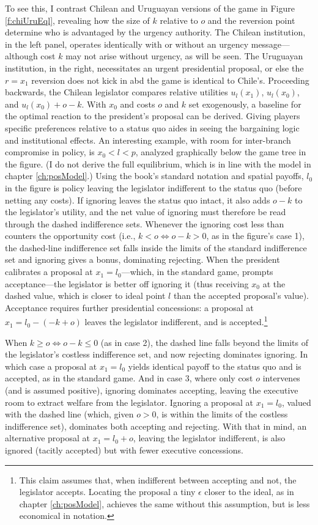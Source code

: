 \documentclass[letter,12pt]{article}
\begin{document}
To see this, I contrast Chilean and Uruguayan versions of the game in Figure \ref{f:chiUruEql}, revealing how the size of $k$ relative to $o$ and the reversion point determine who is advantaged by the urgency authority. The Chilean institution, in the left panel, operates identically with or without an urgency message---although cost $k$ may not arise without urgency, as will be seen. The Uruguayan institution, in the right, necessitates an urgent presidential proposal, or else the $r=x_1$ reversion does not kick in abd the game is identical to Chile's. Proceeding backwards, the Chilean legislator compares relative utilities $u_l(x_1)$, $u_l(x_0)$, and $u_l(x_0)+o-k$. With $x_0$ and costs $o$ and $k$ set exogenously, a baseline for the optimal reaction to the president's proposal can be derived. Giving players specific preferences relative to a status quo aides in seeing the bargaining logic and institutional effects. An interesting example, with room for inter-branch compromise in policy, is $x_0 < l < p$, analyzed graphically below the game tree in the figure. (I do not derive the full equilibrium, which is in line with the model in chapter \ref{ch:posModel}.) Using the book's standard notation and spatial payoffs, $l_0$ in the figure is policy leaving the legislator indifferent to the status quo (before netting any costs). If ignoring leaves the status quo intact, it also adds $o-k$ to the legislator's utility, and the net value of ignoring must therefore be read through the dashed indifference sets. Whenever the ignoring cost less than counters the opportunity cost (i.e., $k<o \iff o-k>0$, as in the figure's case 1), the dashed-line indifference set falls inside the limits of the standard indifference set and ignoring gives a bonus, dominating rejecting. When the president calibrates a proposal at $x_1 = l_0$---which, in the standard game, prompts acceptance---the legislator is better off ignoring it (thus receiving $x_0$ at the dashed value, which is closer to ideal point $l$ than the accepted proposal's value). Acceptance requires further presidential concessions: a proposal at $x_1=l_0-(-k+o)$ leaves the legislator indifferent, and is accepted.\footnote{This claim assumes that, when indifferent between accepting and not, the legislator accepts. Locating the proposal a tiny $\epsilon$ closer to the ideal, as in chapter \ref{ch:posModel}, achieves the same without this assumption, but is less economical in notation.} 

When $k\geq o \iff o-k\leq0$ (as in case 2), the dashed line falls beyond the limits of the legislator's costless indifference set, and now rejecting dominates ignoring. In which case a proposal at $x_1=l_0$ yields identical payoff to the status quo and is accepted, as in the standard game. And in case 3, where only cost $o$ intervenes (and is assumed positive), ignoring dominates accepting, leaving the executive room to extract welfare from the legislator. Ignoring a proposal at $x_1=l_0$, valued with the dashed line (which, given $o>0$, is within the limits of the costless indifference set), dominates both accepting and rejecting. With that in mind, an alternative proposal at $x_1=l_0+o$, leaving the legislator indifferent, is also ignored (tacitly accepted) but with fewer executive concessions. 
\end{document}
